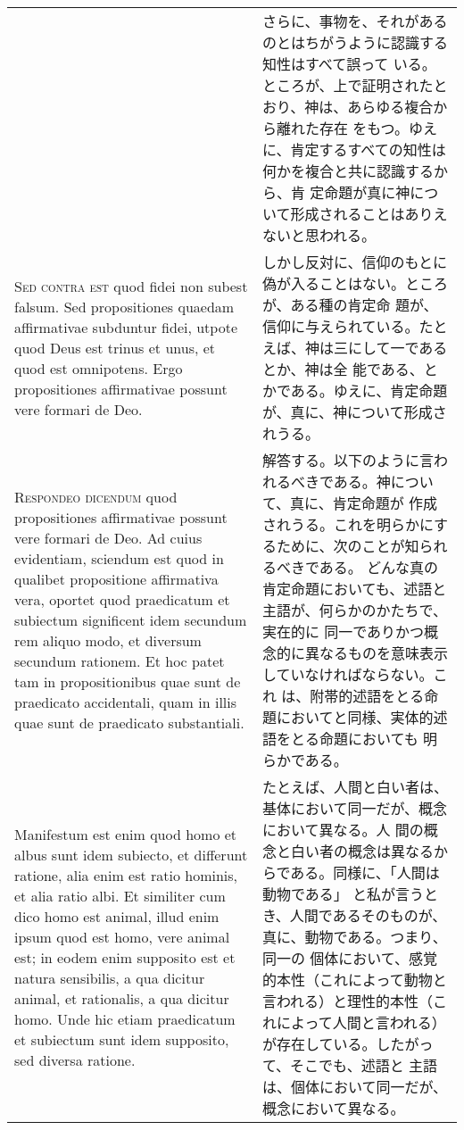 \documentclass[paper=a4paper,fontsize=10pt,jafontsize=9pt,titlepage]{jlreq}
\begin{document}
\begin{longtable}{p{21em}p{21em}}
&

さらに、事物を、それがあるのとはちがうように認識する知性はすべて誤って
いる。ところが、上で証明されたとおり、神は、あらゆる複合から離れた存在
をもつ。ゆえに、肯定するすべての知性は何かを複合と共に認識するから、肯
定命題が真に神について形成されることはありえないと思われる。

\\

{\scshape Sed contra est} quod fidei non subest falsum. Sed
propositiones quaedam affirmativae subduntur fidei, utpote quod Deus
est trinus et unus, et quod est omnipotens. Ergo propositiones
affirmativae possunt vere formari de Deo.

&

しかし反対に、信仰のもとに偽が入ることはない。ところが、ある種の肯定命
題が、信仰に与えられている。たとえば、神は三にして一であるとか、神は全
能である、とかである。ゆえに、肯定命題が、真に、神について形成されうる。

\\

{\scshape Respondeo dicendum} quod propositiones affirmativae possunt
vere formari de Deo. Ad cuius evidentiam, sciendum est quod in
qualibet propositione affirmativa vera, oportet quod praedicatum et
subiectum significent idem secundum rem aliquo modo, et diversum
secundum rationem. Et hoc patet tam in propositionibus quae sunt de
praedicato accidentali, quam in illis quae sunt de praedicato
substantiali.

&

解答する。以下のように言われるべきである。神について、真に、肯定命題が
作成されうる。これを明らかにするために、次のことが知られるべきである。
どんな真の肯定命題においても、述語と主語が、何らかのかたちで、実在的に
同一でありかつ概念的に異なるものを意味表示していなければならない。これ
は、附帯的述語をとる命題においてと同様、実体的述語をとる命題においても
明らかである。

\\

Manifestum est enim quod homo et albus sunt idem subiecto, et
differunt ratione, alia enim est ratio hominis, et alia ratio albi. Et
similiter cum dico homo est animal, illud enim ipsum quod est homo,
vere animal est; in eodem enim supposito est et natura sensibilis, a
qua dicitur animal, et rationalis, a qua dicitur homo.  Unde hic etiam
praedicatum et subiectum sunt idem supposito, sed diversa ratione.

&

たとえば、人間と白い者は、基体において同一だが、概念において異なる。人
間の概念と白い者の概念は異なるからである。同様に、「人間は動物である」
と私が言うとき、人間であるそのものが、真に、動物である。つまり、同一の
個体において、感覚的本性（これによって動物と言われる）と理性的本性（こ
れによって人間と言われる）が存在している。したがって、そこでも、述語と
主語は、個体において同一だが、概念において異なる。


\end{longtable}
\end{document}
